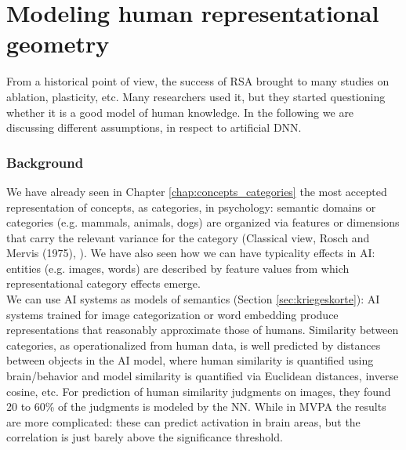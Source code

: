 \chapter{Modeling human representational geometry}
\label{chap:modeling_human}

From a historical point of view, the success of RSA brought to many studies on ablation, plasticity, etc. Many researchers used it, but they started questioning whether it is a good model of human knowledge. In the following we are discussing different assumptions, in respect to artificial DNN.

\subsection{Background}
We have already seen in Chapter \ref{chap:concepts_categories} the most accepted representation of concepts, as categories, in psychology: semantic domains or categories (e.g. mammals, animals, dogs) are organized via features or dimensions that carry the relevant variance for the category (Classical view, Rosch and Mervis (1975), \cite{lake-2015-deep}).
We have also seen how we can have typicality effects in AI: entities (e.g. images, words) are described by feature values from which representational category effects emerge.\\

We can use AI systems as models of semantics (Section \ref{sec:kriegeskorte}): AI systems trained for image categorization or word embedding produce representations that reasonably approximate those of humans. Similarity between categories, as operationalized from human data, is well predicted by distances between objects in the AI model, where human similarity is quantified using brain/behavior and model similarity is quantified via Euclidean distances, inverse cosine, etc.
For prediction of human similarity judgments on images, they found 20 to 60\% of the judgments is modeled by the NN. While in MVPA the results are more complicated: these can predict activation in brain areas, but the correlation is just barely above the significance threshold.

